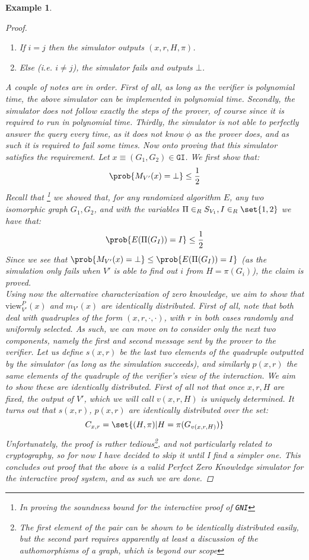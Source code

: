 \documentclass{article}
\newtheorem{example}{Example}
\begin{document}
\begin{example}
\begin{proof}
\begin{enumerate}
            \item If $i = j$ then the simulator outputs $(x, r, H, \pi)$.
            \item Else (i.e. $i \neq j$), the simulator fails and outputs $\bot$.
        \end{enumerate}
        A couple of notes are in order. First of all, as long as the verifier is polynomial time, the above simulator can be implemented in polynomial time.
        Secondly, the simulator does not follow exactly the steps of the prover, of course since it is required to run in polynomial time.
        Thirdly, the simulator is not able to perfectly answer the query every time, as it does not know $\phi$ as the prover does, and as such it is required to fail some times.
        Now onto proving that this simulator satisfies the requirement.
        Let $x \equiv (G_1, G_2) \in \texttt{GI}$.
        We first show that:
        \[ \prob{M_{V'}(x) = \bot} \leq \frac{1}{2} \]
        Recall that \footnote{In proving the soundness bound for the interactive proof of \texttt{GNI}} we showed that, for any randomized algorithm $E$, any two isomorphic graph $G_1, G_2$, and with the variables $\Pi \in_R S_{V_1}, I \in_R \set{1, 2}$ we have that:
        \[ \prob{E(\Pi(G_I)) = I} \leq \frac{1}{2} \]
        Since we see that $\prob{M_{V'}(x) = \bot} \leq \prob{E(\Pi(G_I)) = I}$ (as the simulation only fails when $V'$ is able to find out $i$ from $H = \pi(G_i)$), the claim is proved. \\
        Using now the alternative characterization of zero knowledge, we aim to show that $\text{view}^{P}_{V'}(x)$ and $m_{V'}(x)$ are identically distributed.
        First of all, note that both deal with quadruples of the form $(x, r, \cdot, \cdot)$, with $r$  in both cases randomly and uniformly selected. As such, we can move on to consider only the next two components, namely the first and second message sent by the prover to the verifier.
        Let us define $s(x,r)$ be the last two elements of the quadruple outputted by the simulator (as long as the simulation succeeds), and similarly $p(x,r)$ the same elements of the quadruple of the verifier's view of the interaction.
        We aim to show these are identically distributed. First of all not that once $x,r,H$ are fixed, the output of $V'$, which we will call $v(x,r,H)$ is uniquely determined.
        It turns out that $s(x,r)$, $p(x,r)$ are identically distributed over the set:
        \[ C_{x,r} = \set{ (H, \pi) | H = \pi(G_{v(x,r,H)}) } \]
        Unfortunately, the proof is rather tedious\footnote{The first element of the pair can be shown to be identically distributed easily, but the second part requires apparently at least a discussion of the authomorphisms of a graph, which is beyond our scope}, and not particularly related to cryptography, so for now I have decided to skip it until I find a simpler one.
        This concludes out proof that the above is a valid Perfect Zero Knowledge simulator for the interactive proof system, and as such we are done.
    \end{proof}
\end{example}
\end{document}
